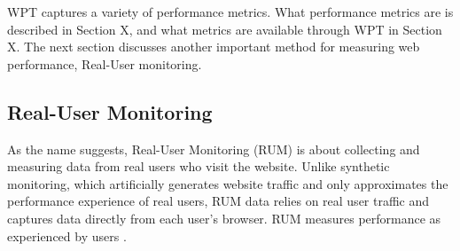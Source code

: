 
WPT captures a variety of performance metrics.
What performance metrics are is described in Section X, and what metrics are available through WPT in Section X.
The next section discusses another important method for measuring web performance, Real-User monitoring.










\subsection{Real-User Monitoring} %
\label{subsection:RUM}

As the name suggests, Real-User Monitoring (RUM) is about collecting and measuring data from real users who visit the website.
Unlike synthetic monitoring, which artificially generates website traffic and only approximates the performance experience of real users, RUM data relies on real user traffic and captures data directly from each user's browser. 
RUM measures performance as experienced by users \cite{2021MDNRUMvsSynthetic}.


